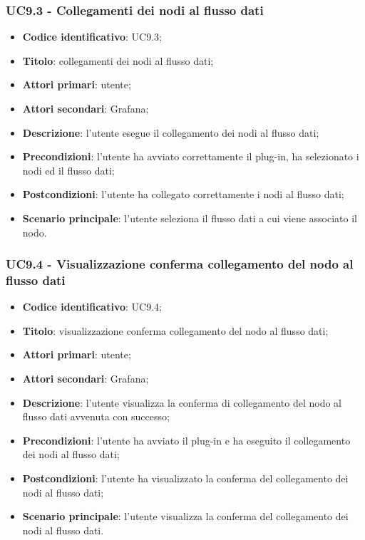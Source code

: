 \subsubsection{UC9.3 - Collegamenti dei nodi al flusso dati}
\begin{itemize}
	\item \textbf{Codice identificativo}: UC9.3;
	\item \textbf{Titolo}: collegamenti dei nodi al flusso dati;
	\item \textbf{Attori primari}: utente;
	\item \textbf{Attori secondari}: Grafana\glo;
	\item \textbf{Descrizione}: l'utente esegue il collegamento dei nodi al flusso dati;
	\item \textbf{Precondizioni}: l'utente ha avviato correttamente il plug-in, ha selezionato i nodi ed il flusso dati;
	\item \textbf{Postcondizioni}: l'utente ha collegato correttamente i nodi al flusso dati;
	\item \textbf{Scenario principale}: l'utente seleziona il flusso dati a cui viene associato il nodo.
\end{itemize}

\subsubsection{UC9.4 - Visualizzazione conferma collegamento del nodo al flusso dati}
\begin{itemize}
	\item \textbf{Codice identificativo}: UC9.4;
	\item \textbf{Titolo}: visualizzazione conferma collegamento del nodo al flusso dati;
	\item \textbf{Attori primari}: utente;
	\item \textbf{Attori secondari}: Grafana\glo;
	\item \textbf{Descrizione}: l'utente visualizza la conferma di collegamento del nodo al flusso dati avvenuta con successo;
	\item \textbf{Precondizioni}: l'utente ha avviato il plug-in e ha eseguito il collegamento dei nodi al flusso dati;
	\item \textbf{Postcondizioni}: l'utente ha visualizzato la conferma del collegamento dei nodi al flusso dati;
	\item \textbf{Scenario principale}: l'utente visualizza la conferma del collegamento dei nodi al flusso dati.
\end{itemize}